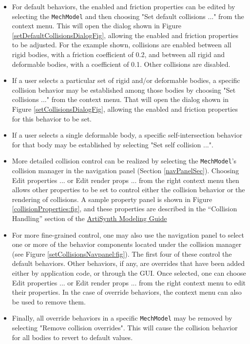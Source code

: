 \documentclass{article}
\begin{document}
\begin{itemize}

\item For default behaviors, the {\sf enabled} and {\sf friction}
properties can be edited by selecting the {\tt MechModel} and then
choosing {\sf "Set default collisions ..."} from the context
menu. This will open the dialog shown in Figure
\ref{setDefaultCollisionsDialogFig}, allowing the {\sf enabled}
and {\sf friction} properties to
be adjusted. For the example shown, collisions are enabled between all
rigid bodies, with a friction coefficient of 0.2, and between all
rigid and deformable bodies, with a coefficient of 0.1. Other
collisions are disabled.

\item If a user selects a particular set of rigid and/or deformable
bodies, a specific collision behavior may be established among those
bodies by choosing {\sf "Set collisions ..."} from the context menu.
That will open the dialog shown in Figure
\ref{setCollisionsDialogFig}, allowing the {\sf enabled} and {\sf
friction} properties for this behavior to be set.

\item If a user selects a single deformable body, a specific
self-intersection behavior for that body may be established by selecting
{\sf "Set self collision ..."}.

\item More detailed collision control can be realized by selecting the
{\tt MechModel}'s collision manager in the navigation panel (Section
\ref{navPanelSec}). Choosing {\sf Edit properties ...} or {\sf Edit
render props ...}  from the right context menu then allows other
properties to be set to control either the collision behavior or the
rendering of collisions. A sample property panel is shown in Figure
\ref{collisionProperties:fig}, and these properties are described in
the ``Collision Handling'' section of the
\href{\artisynthDocBase/html/modelguide/modelguide.html}{ArtiSynth
Modeling Guide}

\item For more fine-grained control, one may also use the navigation
panel to select one or more of the behavior components located under
the collision manager (see Figure
\ref{setCollisionsNavpanel:fig}). The first four of these control the
default behaviors. Other behaviors, if any, are overrides that have
been added either by application code, or through the GUI.  Once
selected, one can choose {\sf Edit properties ...} or {\sf Edit render
props ...}  from the right context menu to edit their properties.  In
the case of override behaviors, the context menu can also be used to
remove them.

\item Finally, all override behaviors in a specific {\tt MechModel}
may be removed by selecting {\sf "Remove collision overrides"}. This
will cause the collision behavior for all bodies to revert to default
values.

\end{itemize}
\end{document}
